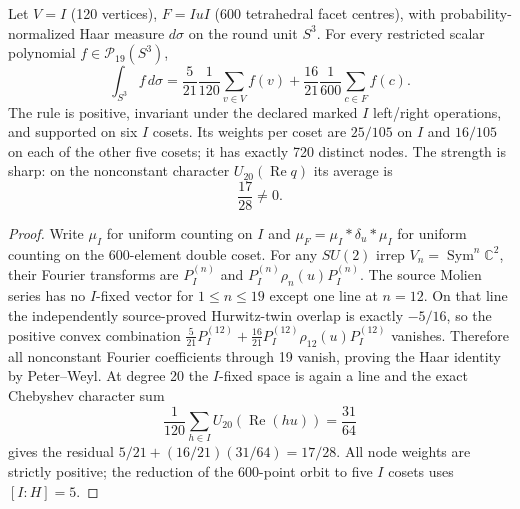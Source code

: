 \documentclass[11pt]{article}
\begin{document}
\begin{theorem}
\label{p1b:thm:cc17-positive-vertex-facet-19}
Let $V=I$ (120 vertices), $F=IuI$ (600 tetrahedral facet centres),
with probability-normalized Haar measure $d\sigma$ on the round unit $S^3$.
For every restricted scalar polynomial $f\in\mathcal P_{19}(S^3)$,
\[
\boxed{\int_{S^3} f\,d\sigma
=\frac5{21}\frac1{120}\sum_{v\in V}f(v)
 +\frac{16}{21}\frac1{600}\sum_{c\in F}f(c).}
\]
The rule is positive, invariant under the declared marked $I$ left/right
operations, and supported on six $I$ cosets. Its weights per coset
are $25/105$ on $I$ and $16/105$ on each of the other five cosets;
it has exactly 720 distinct nodes. The strength is sharp: on the
nonconstant character $U_{20}(\operatorname{Re}q)$ its average is
\[\boxed{\frac{17}{28}\ne0.}\]
\end{theorem}
\begin{proof}
Write $\mu_I$ for uniform counting on $I$ and
$\mu_F=\mu_I*\delta_u*\mu_I$ for uniform counting on the 600-element
double coset. For any $SU(2)$ irrep
$V_n=\operatorname{Sym}^n\mathbb C^2$, their Fourier transforms are
$P_I^{(n)}$ and $P_I^{(n)}\rho_n(u)P_I^{(n)}$.
The source Molien series has no $I$-fixed vector for $1\le n\le19$
except one line at $n=12$. On that line the independently source-proved
Hurwitz-twin overlap is exactly $-5/16$, so the positive convex combination
$\frac5{21}P_I^{(12)}+\frac{16}{21}P_I^{(12)}\rho_{12}(u)P_I^{(12)}$
vanishes. Therefore all nonconstant Fourier coefficients through
19 vanish, proving the Haar identity by Peter--Weyl.
At degree 20 the $I$-fixed space is again a line and the exact
Chebyshev character sum
\[
\frac1{120}\sum_{h\in I}U_{20}(\operatorname{Re}(hu))=\frac{31}{64}
\]
gives the residual $5/21+(16/21)(31/64)=17/28$.
All node weights are strictly positive; the reduction of the
600-point orbit to five $I$ cosets uses $[I:H]=5$.
\end{proof}
\end{document}
